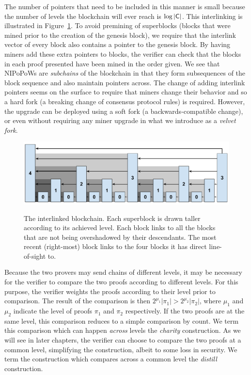 The number of pointers that need to be included in this manner is small because
the number of levels the blockchain will ever reach is $\log|\mathsf{C}|$. This
interlinking is illustrated in Figure~\ref{fig.hierarchy}. To avoid premining of
superblocks (blocks that were mined prior to the creation of the genesis block),
we require that the interlink vector of every block also contains a pointer to
the genesis block. By having miners add these extra pointers to blocks, the
verifier can check that the blocks in each proof presented have been mined in
the order given. We see that NIPoPoWs are \emph{subchains} of the blockchain in
that they form subsequences of the block sequence and also maintain pointers
across. The change of adding interlink pointers seems on the surface to require
that miners change their behavior and so a hard fork (a breaking change of
consensus protocol rules) is required. However, the upgrade can be deployed
using a soft fork (a backwards-compatible change), or even without requiring any
miner upgrade in what we introduce as a \emph{velvet fork}.

\begin{figure}[ht]
    \caption{The interlinked blockchain. Each superblock is drawn taller
    according to its achieved level. Each block links to all the blocks that are
    not being overshadowed by their descendants. The most recent (right-most)
    block links to the four blocks it has direct line-of-sight to.}
    \centering
    \includegraphics[width=0.9\columnwidth,keepaspectratio]{chapters/introduction/figures/level-shadows.pdf}
    \label{fig.hierarchy}
\end{figure}

Because the two provers may send chains of different levels, it may be necessary
for the verifier to compare the two proofs according to different levels. For
this purpose, the verifier weights the proofs according to their level prior to
comparison. The result of the comparison is then
$2^{\mu_1}|\pi_1| > 2^{\mu_2}|\pi_2|$, where $\mu_1$ and $\mu_2$ indicate the
level of proofs $\pi_1$ and $\pi_2$ respectively. If the two proofs are at the
same level, this comparison reduces to a simple comparison by count. We term
this comparison which can happen \emph{across} levels the \emph{charity}
construction. As we will see in later chapters, the verifier can choose to
compare the two proofs at a common level, simplifying the construction, albeit
to some loss in security. We term the construction which compares across a
common level the \emph{distill} construction.

